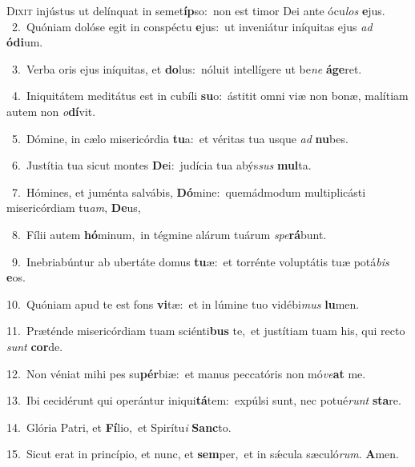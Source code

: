 \lettrine{\initial\textcolor{\initialcolor}{D}}{ixit} injústus ut delínquat in semet\-\textbf{íp}\-so:~\star non est timor Dei ante ócu\textit{los} \textbf{e}\-jus.\\
{\numbfont\textcolor{\numbcolor}{~2.}}~Quóniam dolóse egit in conspéctu \textbf{e}\-jus:~\star ut inveniátur iníquitas ejus \textit{ad} \textbf{ó}\-\textbf{di}um.\par
{\numbfont\textcolor{\numbcolor}{~3.}}~Verba oris ejus iníquitas, et \textbf{do}\-lus:~\star nóluit intellígere ut be\textit{ne} \textbf{á}\-\textbf{ge}ret.\par
{\numbfont\textcolor{\numbcolor}{~4.}}~Iniquitátem meditátus est in cubíli \textbf{su}\-o:~\star ástitit omni viæ non bonæ, malítiam autem non \textit{o}\-\textbf{dí}vit.\par
{\numbfont\textcolor{\numbcolor}{~5.}}~Dómine, in cælo misericórdia \textbf{tu}\-a:~\star et véritas tua usque \textit{ad} \textbf{nu}\-bes.\par
{\numbfont\textcolor{\numbcolor}{~6.}}~Justítia tua sicut montes \textbf{De}\-i:~\star judícia tua abýs\textit{sus} \textbf{mul}\-ta.\par
{\numbfont\textcolor{\numbcolor}{~7.}}~Hómines, et juménta salvábis, \textbf{Dó}\-mine:~\star quemádmodum multiplicásti misericórdiam tu\-\textit{am}\-, \textbf{De}\-us,\par
{\numbfont\textcolor{\numbcolor}{~8.}}~Fílii autem \textbf{hó}\-minum,~\star in tégmine alárum tuárum \textit{spe}\-\textbf{rá}bunt.\par
{\numbfont\textcolor{\numbcolor}{~9.}}~Inebriabúntur ab ubertáte domus \textbf{tu}\-æ:~\star et torrénte voluptátis tuæ potá\textit{bis} \textbf{e}\-os.\par
{\numbfont\textcolor{\numbcolor}{10.}}~Quóniam apud te est fons \textbf{vi}\-tæ:~\star et in lúmine tuo vidébi\textit{mus} \textbf{lu}\-men.\par
{\numbfont\textcolor{\numbcolor}{11.}}~Præténde misericórdiam tuam sciénti\textbf{bus} te,~\star et justítiam tuam his, qui recto \textit{sunt} \textbf{cor}\-de.\par
{\numbfont\textcolor{\numbcolor}{12.}}~Non véniat mihi pes su\-\textbf{pér}\-biæ:~\star et manus peccatóris non mó\-\textit{ve}\-\textbf{at} me.\par
{\numbfont\textcolor{\numbcolor}{13.}}~Ibi cecidérunt qui operántur iniqui\-\textbf{tá}\-tem:~\star expúlsi sunt, nec potué\textit{runt} \textbf{sta}\-re.\par
{\numbfont\textcolor{\numbcolor}{14.}}~Glória Patri, et \textbf{Fí}\-lio,~\star et Spirítu\textit{i} \textbf{Sanc}\-to.\par
{\numbfont\textcolor{\numbcolor}{15.}}~Sicut erat in princípio, et nunc, et \textbf{sem}\-per,~\star et in sǽcula sæculó\-\textit{rum}\-. \textbf{A}\-men.\par
